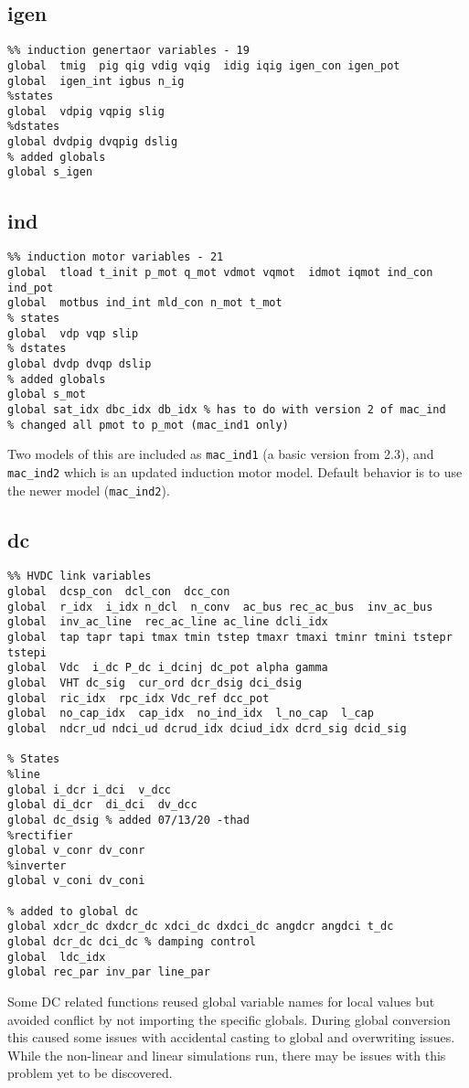 \subsection{igen}
\begin{verbatim}
%% induction genertaor variables - 19
global  tmig  pig qig vdig vqig  idig iqig igen_con igen_pot
global  igen_int igbus n_ig
%states
global  vdpig vqpig slig
%dstates
global dvdpig dvqpig dslig
% added globals
global s_igen
\end{verbatim}


\subsection{ind}
\begin{verbatim}
%% induction motor variables - 21
global  tload t_init p_mot q_mot vdmot vqmot  idmot iqmot ind_con ind_pot
global  motbus ind_int mld_con n_mot t_mot
% states
global  vdp vqp slip
% dstates
global dvdp dvqp dslip
% added globals
global s_mot
global sat_idx dbc_idx db_idx % has to do with version 2 of mac_ind
% changed all pmot to p_mot (mac_ind1 only)
\end{verbatim}
Two models of this are included as \verb|mac_ind1| (a basic version from 2.3), and \verb|mac_ind2| which is an updated induction motor model. Default behavior is to use the newer model (\verb|mac_ind2|).

\subsection{dc}
\begin{verbatim}
%% HVDC link variables 
global  dcsp_con  dcl_con  dcc_con
global  r_idx  i_idx n_dcl  n_conv  ac_bus rec_ac_bus  inv_ac_bus
global  inv_ac_line  rec_ac_line ac_line dcli_idx
global  tap tapr tapi tmax tmin tstep tmaxr tmaxi tminr tmini tstepr tstepi
global  Vdc  i_dc P_dc i_dcinj dc_pot alpha gamma 
global  VHT dc_sig  cur_ord dcr_dsig dci_dsig
global  ric_idx  rpc_idx Vdc_ref dcc_pot
global  no_cap_idx  cap_idx  no_ind_idx  l_no_cap  l_cap
global  ndcr_ud ndci_ud dcrud_idx dciud_idx dcrd_sig dcid_sig

% States
%line
global i_dcr i_dci  v_dcc
global di_dcr  di_dci  dv_dcc
global dc_dsig % added 07/13/20 -thad
%rectifier
global v_conr dv_conr
%inverter
global v_coni dv_coni

% added to global dc
global xdcr_dc dxdcr_dc xdci_dc dxdci_dc angdcr angdci t_dc
global dcr_dc dci_dc % damping control
global  ldc_idx
global rec_par inv_par line_par
\end{verbatim}
Some DC related functions reused global variable names for local values but avoided conflict by not importing the specific globals.
During global conversion this caused some issues with accidental casting to global and overwriting issues.
While the non-linear and linear simulations run, there may be issues with this problem yet to be discovered.

